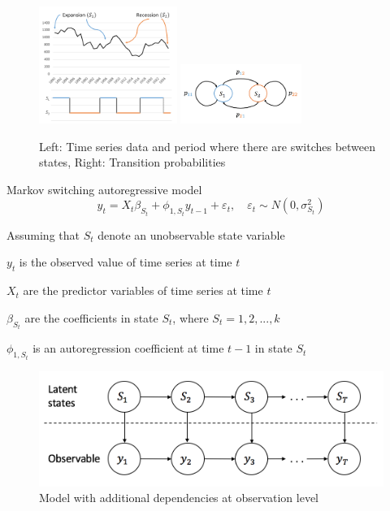 \documentclass{beamer}
\begin{document}
\begin{frame}[fragile]
\begin{figure}
	\includegraphics[width=0.4\textwidth]{msm-ex}
	\hspace{0.1cm}
	\includegraphics[width=0.35\textwidth]{transition1}
	\caption{Left: Time series data and period where there are switches between states, Right: Transition probabilities}
\end{figure}

\end{frame}

\begin{frame}

\begin{block}{Markov switching autoregressive model}
\[
y_{t} = X_{t}\beta_{S_{t}} + \phi_{1,S_{t}} y_{t-1} + \varepsilon_{t}, \quad \varepsilon_{t} \sim N(0,\sigma^{2}_{S_{t}})
\]
\end{block}

Assuming that $S_{t}$ denote an unobservable state variable

$y_{t}$ is the observed value of time series at time $t$ 

$X_{t}$ are the predictor variables of time series at time $t$ 

$\beta_{S_{t}}$ are the coefficients in state $S_{t}$, where $S_{t}=1,2,...,k$

$\phi_{1,S_{t}}$ is an autoregression coefficient at time $t-1$ in state $S_{t}$

\begin{figure}
	\includegraphics[width=0.6\linewidth]{msm-ar1}
	\caption{Model with additional dependencies at observation level}
\end{figure}

\end{frame}
\end{document}
